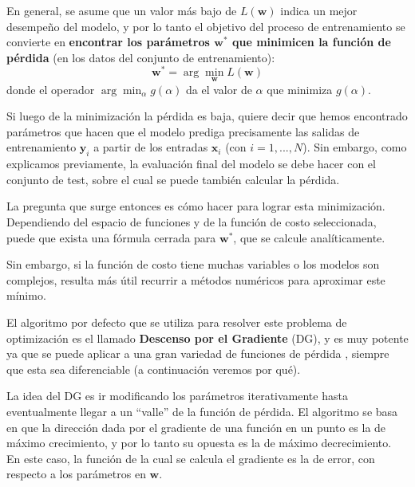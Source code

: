 \documentclass[../../main.tex]{subfiles}
\begin{document}
En general, se asume que un valor más bajo de \(L(\bm{w})\) indica un mejor desempeño del
modelo, y por lo tanto el objetivo del proceso de entrenamiento se convierte en
\textbf{encontrar los parámetros \(\bm{w}^*\) que minimicen la función de pérdida}
(en los datos del conjunto de entrenamiento):
\[
\bm{w}^* = \arg\min_{\bm{w}} L(\bm{w})
\]
donde el operador \(\arg\min_{\alpha} g(\alpha)\) da el valor de \(\alpha\)
que minimiza \(g(\alpha)\).

Si luego de la minimización la pérdida es baja, quiere decir que hemos encontrado
parámetros que hacen que el modelo prediga precisamente las salidas de entrenamiento
\(\bm{y}_i\) a partir de los entradas \(\bm{x}_i\) (con \(i=1,...,N\)). Sin
embargo, como explicamos previamente, la evaluación final del modelo se debe hacer con el
conjunto de test, sobre el cual se puede también calcular la pérdida.

La pregunta que surge entonces es cómo hacer para lograr esta minimización. Dependiendo
del espacio de funciones y de la función de costo seleccionada, puede que exista una
fórmula cerrada para \(\bm{w}^*\), que se calcule analíticamente.

Sin embargo, si la función de costo tiene muchas variables o los modelos son complejos,
resulta más útil recurrir a métodos numéricos para aproximar este mínimo.

El algoritmo por defecto que se utiliza para resolver este problema de optimización es el
llamado \textbf{Descenso por el Gradiente} (DG), y es muy potente ya que se puede aplicar a
una gran variedad de funciones de pérdida \cite{ai-a-modern-approach}, siempre que esta
sea diferenciable (a continuación veremos por qué).

La idea del DG es ir modificando los parámetros iterativamente hasta eventualmente llegar
a un ``valle'' de la función de pérdida. El algoritmo se basa en que la dirección dada por
el gradiente\footnotemark{} de una función en un punto es la de máximo crecimiento, y por
lo tanto su opuesta es la de máximo decrecimiento. En este caso, la función de la cual se
calcula el gradiente es la de error, con respecto a los parámetros en \(\bm{w}\).
\end{document}
